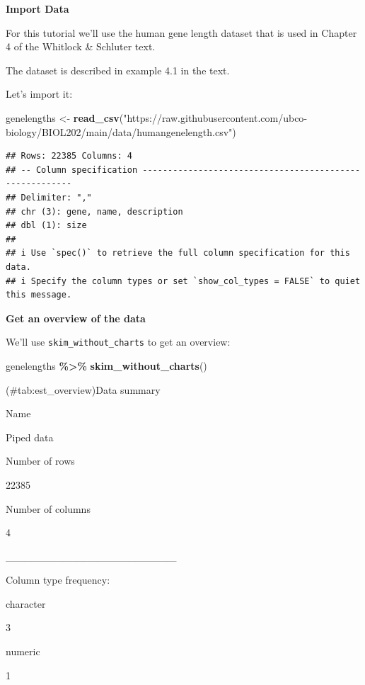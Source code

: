 \documentclass[
]{book}
\newenvironment{Shaded}{\begin{snugshade}}{\end{snugshade}}
\newcommand{\FunctionTok}[1]{\textcolor[rgb]{0.13,0.29,0.53}{\textbf{#1}}}
\newcommand{\NormalTok}[1]{#1}
\newcommand{\OtherTok}[1]{\textcolor[rgb]{0.56,0.35,0.01}{#1}}
\newcommand{\SpecialCharTok}[1]{\textcolor[rgb]{0.81,0.36,0.00}{\textbf{#1}}}
\newcommand{\StringTok}[1]{\textcolor[rgb]{0.31,0.60,0.02}{#1}}
\begin{document}
\textbf{Import Data}

For this tutorial we'll use the human gene length dataset that is used in Chapter 4 of the Whitlock \& Schluter text.

The dataset is described in example 4.1 in the text.

Let's import it:

\begin{Shaded}
\begin{Highlighting}[]
\NormalTok{genelengths }\OtherTok{\textless{}{-}} \FunctionTok{read\_csv}\NormalTok{(}\StringTok{"https://raw.githubusercontent.com/ubco{-}biology/BIOL202/main/data/humangenelength.csv"}\NormalTok{)}
\end{Highlighting}
\end{Shaded}

\begin{verbatim}
## Rows: 22385 Columns: 4
## -- Column specification --------------------------------------------------------
## Delimiter: ","
## chr (3): gene, name, description
## dbl (1): size
## 
## i Use `spec()` to retrieve the full column specification for this data.
## i Specify the column types or set `show_col_types = FALSE` to quiet this message.
\end{verbatim}

\textbf{Get an overview of the data}

We'll use \texttt{skim\_without\_charts} to get an overview:

\begin{Shaded}
\begin{Highlighting}[]
\NormalTok{genelengths }\SpecialCharTok{\%\textgreater{}\%}
  \FunctionTok{skim\_without\_charts}\NormalTok{()}
\end{Highlighting}
\end{Shaded}

(\#tab:est\_overview)Data summary

Name

Piped data

Number of rows

22385

Number of columns

4

\_\_\_\_\_\_\_\_\_\_\_\_\_\_\_\_\_\_\_\_\_\_\_

Column type frequency:

character

3

numeric

1
\end{document}
